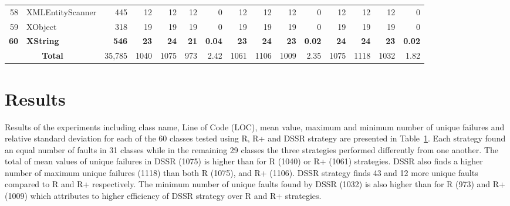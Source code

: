 \begin{table} [htp!]
{\begin{tabularx}{1 \textwidth}{r l r r r r r r r r r r r r r}
58						& XMLEntityScanner			&445		& 12		&	12	&	12	& 	0					& 12		&  12		& 12		& 		0			& 12			& 12			& 12			&	0\\      
59						& XObject					&318		& 19		&	19	&	19	& 	0					& 19		&  19		& 19		& 		0			& 19			& 19			& 19			&	0\\      
\textbf{60}						& \textbf{XString}					&\textbf{546}		& \textbf{23}		&	\textbf{24}	&	\textbf{21}	& 	\textbf{0.04}					& \textbf{23}		&  \textbf{24}		& \textbf{23}		& 		\textbf{0.02}			& \textbf{24}			& \textbf{24}			& \textbf{23}			&	\textbf{0.02}\\      

    						\multicolumn{2}{c}{\textbf{Total}}	&35,785	&1040	&	1075	&    973	&	2.42				& 1061	&1106	&1009	&		2.35		& 1075		& 1118		& 1032		& 	1.82\\
     \end{tabularx} }
    \bigskip
    \label{table:Results}
\end{table}

\section{Results}\label{sec:res}
Results of the experiments including class name, Line of Code (LOC), mean value, maximum and minimum number of unique failures and relative standard deviation for each of the 60 classes tested using R, R+ and DSSR strategy are presented in Table~\ref{table:Results}. Each strategy found an equal number of faults in 31 classes while in the remaining 29 classes the three strategies performed differently from one another. The total of mean values of unique failures in DSSR (1075) is higher than for R (1040) or R+ (1061) strategies. 
DSSR also finds a higher number of maximum unique failures (1118) than both R (1075), and R+ (1106). DSSR strategy finds 43 and 12 more unique faults compared to R and R+ respectively. The minimum number of unique faults found by DSSR (1032) is also higher than for R (973) and R+ (1009) which attributes to higher efficiency of DSSR strategy over R and R+ strategies. 


